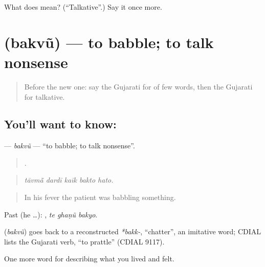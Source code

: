 \begin{tcolorbox}[breakable,colback=teal!4,colframe=teal!35!black,title={Before you move on}]
What does  mean? (\textquotedblleft{}Talkative\textquotedblright{}.) Say it once more.
\end{tcolorbox}
\section[\texorpdfstring{\gu{બકવું} (bakvũ)}{બકવું (bakvũ)}]{ (bakvũ) — to babble; to talk nonsense}

\label{lesson:GU-C463-bakvu}



\begin{quote}
Before the new one: say the Gujarati for of few words, then the Gujarati for talkative.
\end{quote}

\subsection*{You'll want to know: }
\textbf{} — \emph{bakvũ} — \textquotedblleft{}to babble; to talk nonsense\textquotedblright{}.

\begin{quote}
    .
\end{quote}

\begin{quote}
\emph{tāvmā̃ dardī kaīk bakto hato.}
\end{quote}

\begin{quote}
In his fever the patient was babbling something.
\end{quote}

Past (he …):   , \emph{te ghaṇũ bakyo}.

\begin{cousinweb}
\textbf{} (\emph{bakvũ}) goes back to a reconstructed \emph{*bakk-}, \textquotedblleft{}chatter\textquotedblright{}, an imitative word; CDIAL lists the Gujarati verb, \textquotedblleft{}to prattle\textquotedblright{} (CDIAL 9117).
\end{cousinweb}

\begin{grammarlens}[title={What you've built}]
One more word for describing what you lived and felt.
\end{grammarlens}

